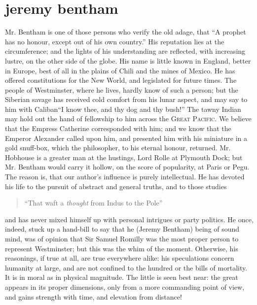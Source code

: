 
\chapter[Jeremy Bentham]{jeremy bentham} 

Mr. Bentham is one of those persons who verify the old adage, that
``A prophet has no honour, except out of his own country.'' His
reputation lies at the circumference; and the lights of his
understanding are reflected, with increasing lustre, on the other
side of the globe. His name is little known in England, better in
Europe, best of all in the plains of Chili and the mines of
Mexico. He has offered constitutions for the New World, and
legislated for future times. The people of Westminster, where he
lives, hardly know of such a person; but the Siberian savage has
received cold comfort from his lunar aspect, and may say to him
with Caliban\textemdash ``I know thee, and thy dog and thy bush!''
The tawny Indian may hold out the hand of fellowship to him across
the \textsc{Great Pacific}. We believe that the Empress Catherine
corresponded with him; and we know that the Emperor Alexander
called upon him, and presented him with his miniature in a gold
snuff-box, which the philosopher, to his eternal honour,
returned. Mr. Hobhouse is a greater man at the hustings, Lord
Rolle at Plymouth Dock; but Mr. Bentham would carry it hollow, on
the score of popularity, at Paris or Pegu. The reason is, that our
author's influence is purely intellectual. He has devoted his life
to the pursuit of abstract and general truths, and to those
studies\textemdash
\begin{quote} ``That waft a \emph{thought} from Indus to the
Pole''\textemdash
\end{quote} and has never mixed himself up with personal intrigues
or party politics. He once, indeed, stuck up a hand-bill to say
that he (Jeremy Bentham) being of sound mind, was of opinion that
Sir Samuel Romilly was the most proper person to represent
Westminster; but this was the whim of the moment. Otherwise, his
reasonings, if true at all, are true everywhere alike: his
speculations concern humanity at large, and are not confined to
the hundred or the bills of mortality. It is in moral as in
physical magnitude. The little is seen best near: the great
appears in its proper dimensions, only from a more commanding
point of view, and gains strength with time, and elevation from
distance!

